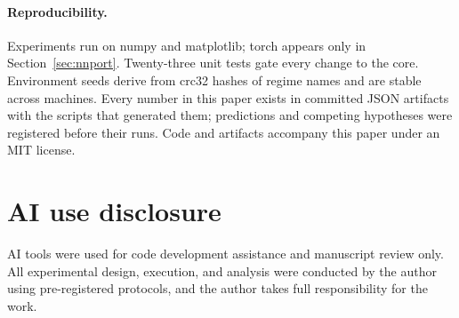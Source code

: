 \documentclass[11pt]{article}
\begin{document}
\paragraph{Reproducibility.}
Experiments run on numpy and matplotlib; torch appears only in Section~\ref{sec:nnport}. Twenty-three
unit tests gate every change to the core. Environment seeds derive from crc32 hashes of regime names
and are stable across machines. Every number in this paper exists in committed JSON artifacts with the
scripts that generated them; predictions and competing hypotheses were registered before their runs.
Code and artifacts accompany this paper under an MIT license.

\section*{AI use disclosure}
AI tools were used for code development assistance and manuscript review only. All experimental design,
execution, and analysis were conducted by the author using pre-registered protocols, and the author
takes full responsibility for the work.
\end{document}

